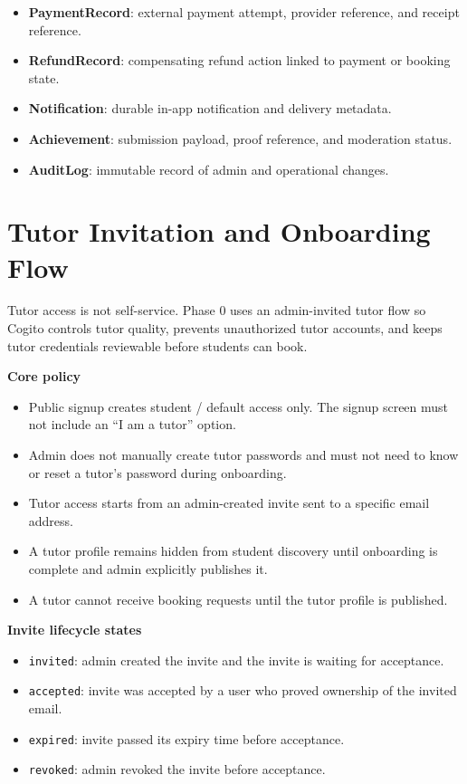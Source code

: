 \documentclass[11pt,a4paper]{article}
\begin{document}
\begin{itemize}
    \item \textbf{PaymentRecord}: external payment attempt, provider reference, and receipt reference.
    \item \textbf{RefundRecord}: compensating refund action linked to payment or booking state.
    \item \textbf{Notification}: durable in-app notification and delivery metadata.
    \item \textbf{Achievement}: submission payload, proof reference, and moderation status.
    \item \textbf{AuditLog}: immutable record of admin and operational changes.
\end{itemize}

\section{Tutor Invitation and Onboarding Flow}

Tutor access is not self-service. Phase 0 uses an admin-invited tutor flow so Cogito controls tutor quality, prevents unauthorized tutor accounts, and keeps tutor credentials reviewable before students can book.

\textbf{Core policy}
\begin{itemize}
    \item Public signup creates student / default access only. The signup screen must not include an ``I am a tutor'' option.
    \item Admin does not manually create tutor passwords and must not need to know or reset a tutor's password during onboarding.
    \item Tutor access starts from an admin-created invite sent to a specific email address.
    \item A tutor profile remains hidden from student discovery until onboarding is complete and admin explicitly publishes it.
    \item A tutor cannot receive booking requests until the tutor profile is published.
\end{itemize}

\textbf{Invite lifecycle states}
\begin{itemize}
    \item \texttt{invited}: admin created the invite and the invite is waiting for acceptance.
    \item \texttt{accepted}: invite was accepted by a user who proved ownership of the invited email.
    \item \texttt{expired}: invite passed its expiry time before acceptance.
    \item \texttt{revoked}: admin revoked the invite before acceptance.
\end{itemize}
\end{document}
